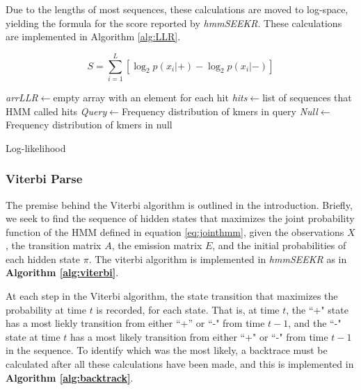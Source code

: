 Due to the lengths of most sequences, these calculations are moved to log-space, yielding the formula for the score reported by \emph{hmmSEEKR}. These calculations are implemented in Algorithm \ref{alg:LLR}.

$$S = \sum_{i=1}^L{\left[\log_2 p(x_i|+)- \log_2 p(x_i|-)\right]}$$
\begin{algorithm}[h]
\DontPrintSemicolon
{}
\SetAlgoLined
\emph{arrLLR}$\leftarrow$empty array with an element for each hit\;
\emph{hits}$\leftarrow$list of sequences that HMM called hits\;
\emph{Query}$\leftarrow$Frequency distribution of kmers in query\;
\emph{Null}$\leftarrow$Frequency distribution of kmers in null\;

 \caption{Log-likelihood}
 \label{alg:LLR}
\end{algorithm}

\subsubsection{Viterbi Parse}

The premise behind the Viterbi algorithm is outlined in the introduction. Briefly, we seek to find the sequence of hidden states that maximizes the joint probability function of the HMM defined in equation \ref{eq:jointhmm}, given the observations $X$, the transition matrix $A$, the emission matrix $E$, and the initial probabilities of each hidden state $\pi$. The viterbi algorithm is implemented in \emph{hmmSEEKR} as in \textbf{Algorithm \ref{alg:viterbi}}.

At each step in the Viterbi algorithm, the state transition that maximizes the probability at time $t$ is recorded, for each state. That is, at time $t$, the ``+" state has a most liekly transition from either ``+'' or ``-" from time $t-1$, and the ``-" state at time $t$ has a most likely transition from either ``+" or ``-" from time $t-1$ in the sequence. To identify which was the most likely, a backtrace must be calculated after all these calculations have been made, and this is implemented in \textbf{Algorithm \ref{alg:backtrack}}.

